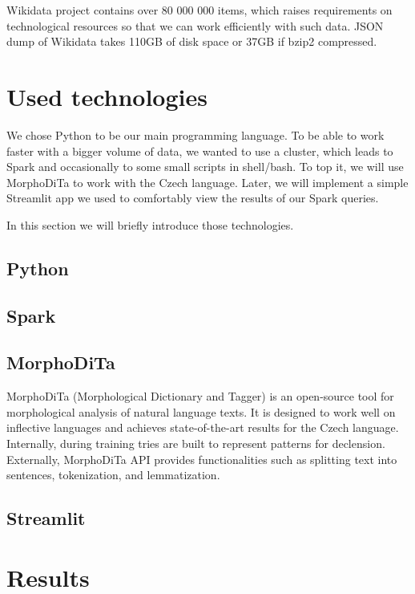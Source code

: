 Wikidata project contains over 80 000 000 items, which raises  requirements on technological resources so that we can work efficiently with such data. JSON dump of Wikidata takes 110GB of disk space or 37GB if bzip2 compressed.



\section{Used technologies}
We chose Python to be our main programming language. To be able to work faster with a bigger volume of data, we wanted to use a cluster, which leads to Spark and occasionally to some small scripts in shell/bash. To top it, we will use MorphoDiTa to work with the Czech language. Later, we will implement a simple Streamlit app we used to comfortably view the results of our Spark queries.

In this section we will briefly introduce those technologies.

\subsection{Python}


\subsection{Spark}

\subsection{MorphoDiTa}

MorphoDiTa \cite{Morphodita} (Morphological Dictionary and Tagger) is an open-source tool for morphological analysis of natural language texts. It is designed to work well on inflective languages and achieves state-of-the-art results for the Czech language. Internally, during training tries are built to represent patterns for declension. Externally, MorphoDiTa API provides functionalities such as splitting text into sentences, tokenization, and lemmatization.

\subsection{Streamlit}




\section{Results}

